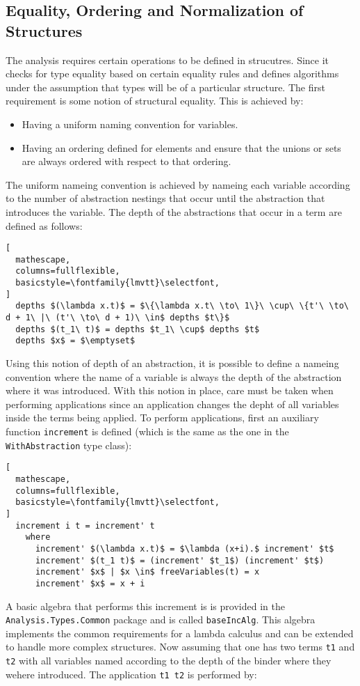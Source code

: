 \documentclass[8pt]{extarticle}
\begin{document}
\subsection{Equality, Ordering and Normalization of Structures}
The analysis requires certain operations to be defined in strucutres. Since it checks for type equality based on certain equality rules and defines algorithms under the assumption that types will be of a particular structure. The first requirement is some notion of structural equality. This is achieved by:
\begin{itemize}
\item Having a uniform naming convention for variables.
\item Having an ordering defined for elements and ensure that the unions or sets are always ordered with respect to that ordering.
\end{itemize}
The uniform nameing convention is achieved by nameing each variable according to the number of abstraction nestings that occur until the abstraction that introduces the variable. The depth of the abstractions that occur in a term are defined as follows:
\begin{lstlisting}[
  mathescape,
  columns=fullflexible,
  basicstyle=\fontfamily{lmvtt}\selectfont,
]
  depths $(\lambda x.t)$ = $\{\lambda x.t\ \to\ 1\}\ \cup\ \{t'\ \to\ d + 1\ |\ (t'\ \to\ d + 1)\ \in$ depths $t\}$
  depths $(t_1\ t)$ = depths $t_1\ \cup$ depths $t$
  depths $x$ = $\emptyset$
\end{lstlisting}
Using this notion of depth of an abstraction, it is possible to define a nameing convention where the name of a variable is always the depth of the abstraction where it was introduced. With this notion in place, care must be taken when performing applications since an application changes the depht of all variables inside the terms being applied. To perform applications, first an auxiliary function \verb+increment+ is defined (which is the same as the one in the \verb+WithAbstraction+ type class):
\begin{lstlisting}[
  mathescape,
  columns=fullflexible,
  basicstyle=\fontfamily{lmvtt}\selectfont,
]
  increment i t = increment' t
    where
      increment' $(\lambda x.t)$ = $\lambda (x+i).$ increment' $t$
      increment' $(t_1 t)$ = (increment' $t_1$) (increment' $t$)
      increment' $x$ | $x \in$ freeVariables(t) = x
      increment' $x$ = x + i
\end{lstlisting}
A basic algebra that performs this increment is is provided in the \verb+Analysis.Types.Common+ package and is called \verb+baseIncAlg+. This algebra implements the common requirements for a lambda calculus and can be extended to handle more complex structures. Now assuming that one has two terms \verb+t1+ and \verb+t2+ with all variables named according to the depth of the binder where they wehere introduced. The application \verb+t1 t2+ is performed by:
\end{document}
